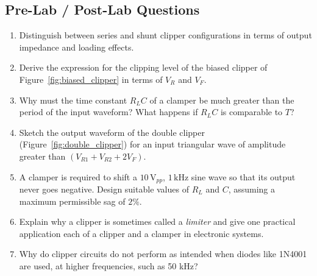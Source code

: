\subsection{Pre-Lab / Post-Lab Questions}
\begin{enumerate}[label=Q\arabic*.]
	\item Distinguish between series and shunt clipper configurations in terms of output impedance and loading effects.
	\item Derive the expression for the clipping level of the biased clipper of Figure~\ref{fig:biased_clipper} in terms of $V_R$ and $V_F$.
	\item Why must the time constant $R_L C$ of a clamper be much greater than the period of the input waveform? What happens if $R_L C$ is comparable to $T$?
	\item Sketch the output waveform of the double clipper (Figure~\ref{fig:double_clipper}) for an input triangular wave of amplitude greater than $(V_{R1}+V_{R2}+2V_F)$.
	\item A clamper is required to shift a $10\,\text{V}_{pp}$, $1\,\text{kHz}$ sine wave so that its output never goes negative. Design suitable values of $R_L$ and $C$, assuming a maximum permissible sag of $2\%$.
	\item Explain why a clipper is sometimes called a \emph{limiter} and give one practical application each of a clipper and a clamper in electronic systems.
	\item Why do clipper circuits do not perform as intended when diodes like 1N4001 are used, at higher frequencies, such as 50 kHz?
\end{enumerate}
